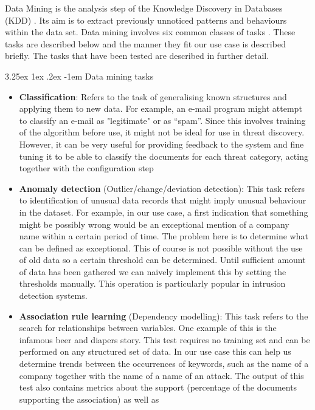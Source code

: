 \documentclass[12pt]{article}
\makeatletter
\newcounter{subsubsubsection}[subsubsection]
\renewcommand\paragraph{\@startsection{paragraph}{5}{\z@}%
  {3.25ex \@plus1ex \@minus.2ex}%
  {-1em}%
  {\normalfont\normalsize\bfseries}}
\makeatother
\begin{document}
Data Mining is the analysis step of the Knowledge Discovery in Databases (KDD) \cite{datamining}. Its aim is to extract previously unnoticed patterns and behaviours within the data set. Data mining involves six common classes of tasks \cite{datamining}. These tasks are described below and the manner they fit our use case is described briefly. The tasks that have been tested are described in further detail. 

\paragraph{Data mining tasks}
\begin{itemize}
\item 
\textbf{Classification}: Refers to the task of generalising known structures and applying them to new
data. For example, an e-mail program might attempt to classify an e-mail as "legitimate" or as
“spam”. Since this involves training of the algorithm before use, it might not be ideal for use in
threat discovery. However, it can be very useful for providing feedback to the system and fine
tuning it to be able to classify the documents for each threat category, acting together with the
configuration step
\item 
\textbf{Anomaly detection} (Outlier/change/deviation detection): This task refers to identification of
unusual data records that might imply unusual behaviour in the dataset. For example, in our
use case, a first indication that something might be possibly wrong would be an exceptional
mention of a company name within a certain period of time. The problem here is to determine
what can be defined as exceptional. This of course is not possible without the use of old data
so a certain threshold can be determined. Until sufficient amount of data has been gathered we
can naively implement this by setting the thresholds manually. This operation is particularly
popular in intrusion detection systems.
\item 
\textbf{Association rule learning} (Dependency modelling): This task refers to the search for
relationships between variables. One example of this is the infamous beer and diapers story.
This test requires no training set and can be performed on any structured set of data. In our
use case this can help us determine trends between the occurrences of keywords, such as the
name of a company together with the name of a name of an attack. The output of this test also
contains metrics about the support (percentage of the documents supporting the association) as well as

\end{itemize}
\end{document}
